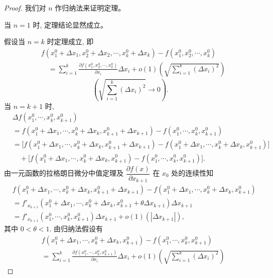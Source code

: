 \documentclass[UTF8,12pt,a4paper,fontset=fandol]{ctexart}
\begin{document}
\begin{proof}\quad 我们对 $n$ 作归纳法来证明定理。

当 $n=1$ 时, 定理结论显然成立。

假设当 $n=k$ 时定理成立, 即
\[
\begin{aligned}
&f(x_1^0+\Delta x_1,x_2^0+\Delta x_2,\cdots,x_k^0+\Delta x_k)
  -f(x_1^0,x_2^0,\cdots,x_k^0)\\
&\quad =
  \sum_{i=1}^k
  \frac{\partial f(x_1^0,x_2^0,\cdots,x_k^0)}{\partial x_i}\Delta x_i
  +o(1)\left(\sqrt{\sum_{i=1}^k(\Delta x_i)^2}\right)
\end{aligned}
\]
\[
  \left(\sqrt{\sum_{i=1}^k(\Delta x_i)^2}\to0\right).
\]
当 $n=k+1$ 时,
\[
\begin{aligned}
&\Delta f(x_1^0,\cdots,x_k^0,x_{k+1}^0)\\
&=f(x_1^0+\Delta x_1,\cdots,x_k^0+\Delta x_k,x_{k+1}^0+\Delta x_{k+1})
  -f(x_1^0,\cdots,x_k^0,x_{k+1}^0)\\
&=\big[f(x_1^0+\Delta x_1,\cdots,x_k^0+\Delta x_k,x_{k+1}^0+\Delta x_{k+1})
  -f(x_1^0+\Delta x_1,\cdots,x_k^0+\Delta x_k,x_{k+1}^0)\big]\\
&\quad+\big[f(x_1^0+\Delta x_1,\cdots,x_k^0+\Delta x_k,x_{k+1}^0)
  -f(x_1^0,\cdots,x_k^0,x_{k+1}^0)\big].
\end{aligned}
\]
由一元函数的拉格朗日微分中值定理及 $\dfrac{\partial f(x)}{\partial x_{k+1}}$ 在 $x_0$ 处的连续性知
\begin{equation}\label{course-eq-14-1-1}
\begin{aligned}
&f(x_1^0+\Delta x_1,\cdots,x_k^0+\Delta x_k,x_{k+1}^0+\Delta x_{k+1})
  -f(x_1^0+\Delta x_1,\cdots,x_k^0+\Delta x_k,x_{k+1}^0)\\
&=f'_{x_{k+1}}(x_1^0+\Delta x_1,\cdots,x_k^0+\Delta x_k,
  x_{k+1}^0+\theta\Delta x_{k+1})\Delta x_{k+1}\\
&=f'_{x_{k+1}}(x_1^0,\cdots,x_k^0,x_{k+1}^0)\Delta x_{k+1}
  +o(1)(|\Delta x_{k+1}|),
\end{aligned}
\end{equation}
其中 $0<\theta<1$. 由归纳法假设有
\begin{equation}\label{course-eq-14-1-2}
\begin{aligned}
&f(x_1^0+\Delta x_1,\cdots,x_k^0+\Delta x_k,x_{k+1}^0)
  -f(x_1^0,\cdots,x_k^0,x_{k+1}^0)\\
&=
\sum_{i=1}^k
\frac{\partial f(x_1^0,\cdots,x_k^0,x_{k+1}^0)}{\partial x_i}\Delta x_i
+o(1)\left(\sqrt{\sum_{i=1}^k(\Delta x_i)^2}\right)
\end{aligned}
\end{equation}

\end{proof}
\end{document}
